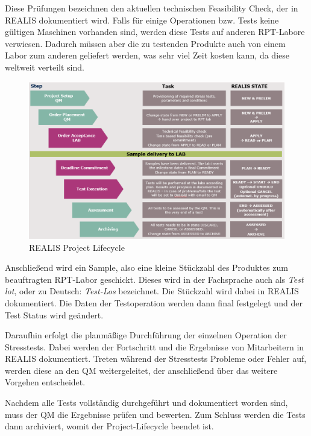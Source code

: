 Diese Prüfungen bezeichnen den aktuellen technischen Feasibility Check, der in \gls{REALIS} dokumentiert wird.
Falls für einige Operationen bzw. Tests keine gültigen Maschinen vorhanden sind, werden diese Tests auf anderen \gls{RPT}-Labore verwiesen. Dadurch müssen aber die zu testenden Produkte auch von einem Labor zum anderen geliefert werden, was sehr viel Zeit kosten kann, da diese weltweit verteilt sind.

\begin{figure}[!h]
    \centering
    \includegraphics[width=1\textwidth]{bilder/realis-project-lifecycle.png}
    \caption{REALIS Project Lifecycle}
    \label{fig:realis-project-lifecycle}
\end{figure}

Anschließend wird ein Sample, also eine kleine Stückzahl des Produktes zum beauftragten \gls{RPT}-Labor geschickt. Dieses wird in der Fachsprache auch als \textit{Test \gls{lot}}, oder zu Deutsch: \textit{Test-Los} 
bezeichnet. Die Stückzahl wird dabei in \gls{REALIS} dokumentiert. Die  Daten der Testoperation werden dann final festgelegt und der Test Status wird geändert.

Daraufhin erfolgt die planmäßige Durchführung der einzelnen Operation der Stresstests. Dabei werden der Fortschritt und die Ergebnisse von Mitarbeitern in \gls{REALIS} dokumentiert. Treten während der Stresstests Probleme oder Fehler auf, werden diese an den \gls{QM} weitergeleitet, der anschließend über das weitere Vorgehen entscheidet.

Nachdem alle Tests vollständig durchgeführt und dokumentiert worden sind, muss der \gls{QM} die Ergebnisse prüfen und bewerten. Zum Schluss werden die Tests dann archiviert, womit der Project-Lifecycle beendet ist.

